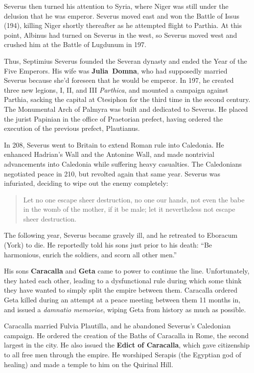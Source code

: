 Severus then turned his attention to Syria,
where Niger was still under the delusion that he was emperor.
Severus moved east and won the Battle of Issus (194),
killing Niger shortly thereafter as he attempted flight to Parthia.
At this point, Albinus had turned on Severus in the west,
so Severus moved west and crushed him at the Battle of Lugdunum in 197.

Thus, Septimius Severus founded the Severan dynasty and ended the Year of the Five Emperors.
His wife was \textbf{Julia~Domna},
who had supposedly married Severus because she'd foreseen that he would be emperor.
In 197, he created three new legions, I, II, and III \textit{Parthica},
and mounted a campaign against Parthia,
sacking the capital at Ctesiphon for the third time in the second century.
The Monumental Arch of Palmyra was built and dedicated to Severus.
He placed the jurist Papinian in the office of Praetorian prefect,
having ordered the execution of the previous prefect, Plautianus.

In 208, Severus went to Britain to extend Roman rule into Caledonia.
He enhanced Hadrian's Wall and the Antonine Wall,
and made nontrivial advancements into Caledonia while suffering heavy casualties.
The Caledonians negotiated peace in 210, but revolted again that same year.
Severus was infuriated, deciding to wipe out the enemy completely:
\begin{quote}
  Let no one escape sheer destruction,
  no one our hands, not even the babe in the womb of the mother, if it be male;
  let it nevertheless not escape sheer destruction.
\end{quote}
The following year, Severus became gravely ill,
and he retreated to Eboracum (York) to die.
He reportedly told his sons just prior to his death:
``Be harmonious, enrich the soldiers, and scorn all other men.''

His sons \textbf{Caracalla} and \textbf{Geta} came to power to continue the line.
Unfortunately, they hated each other,
leading to a dysfunctional rule
during which some think they have wanted to simply split the empire between them.
Caracalla ordered Geta killed during an attempt at a peace meeting between them 11 months in,
and issued a \textit{damnatio memoriae}, wiping Geta from history as much as possible.

Caracalla married Fulvia Plautilla, and he abandoned Severus's Caledonian campaign.
He ordered the creation of the Baths of Caracalla in Rome,
the second largest in the city.
He also issued the \textbf{Edict of Caracalla},
which gave citizenship to all free men through the empire.
He worshiped Serapis (the Egyptian god of healing) and made a temple to him on the Quirinal Hill.

